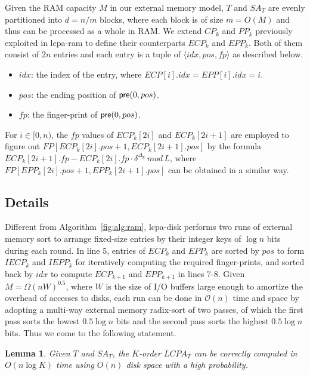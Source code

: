\documentclass{llncs}
\newtheorem{lem}{Lemma}
\begin{document}
Given the RAM capacity $M$ in our external memory model, $T$ and $SA_T$ are evenly partitioned into $d=n/m$ blocks, where each block is of size $m=O(M)$ and thus can be processed as a whole in RAM. We extend $CP_k$ and $PP_k$ previously exploited in lcpa-ram to define their counterparts $ECP_k$ and $EPP_k$. Both of them consist of $2n$ entries and each entry is a tuple of $\langle idx, pos, fp \rangle$ as described below.
\begin{itemize}
\item $idx$: the index of the entry, where $ECP[i].idx=EPP[i].idx=i$.
\item $pos$: the ending position of ${\sf pre}(0,pos)$.
\item $fp$: the finger-print of ${\sf pre}(0,pos)$.
\end{itemize}

For $i\in [0,n)$, the $fp$ values of $ECP_k[2i]$ and $ECP_k[2i+1]$ are employed to figure out $FP[ECP_k[2i].pos+1, ECP_k[2i+1].pos]$ by the formula $ECP_k[2i+1].fp - ECP_k[2i].fp \cdot \delta^{\Delta_k} \, mod \, L$, where $FP[EPP_k[2i].pos+1, EPP_k[2i+1].pos]$ can be obtained in a similar way.

\subsection{Details}
Different from Algorithm~\ref{fig:alg:ram}, lcpa-disk performs two runs of external memory sort to arrange fixed-size entries by their integer keys of $\log n$ bits during each round. In line 5, entries of $ECP_k$ and $EPP_k$ are sorted by $pos$ to form $IECP_k$ and $IEPP_k$ for iteratively computing the required finger-prints, and sorted back by $idx$ to compute $ECP_{k+1}$ and $EPP_{k+1}$ in lines 7-8. Given $M=\Omega(nW)^{0.5}$, where $W$ is the size of {I/O} buffers large enough to amortize the overhead of accesses to disks, each run can be done in $\mathcal{O}(n)$ time and space by adopting a multi-way external memory radix-sort of two passes, of which the first pass sorts the lowest $0.5\log n$ bits and the second pass sorts the highest $0.5\log n$ bits. Thus we come to the following statement.

\begin{lem}
\label{thm:lcp:em}
Given $T$ and $SA_T$, the $K$-order $LCPA_T$ can be correctly computed in $O(n \log K)$ time using $O(n)$ disk space with a high probability.
\end{lem}
\end{document}
